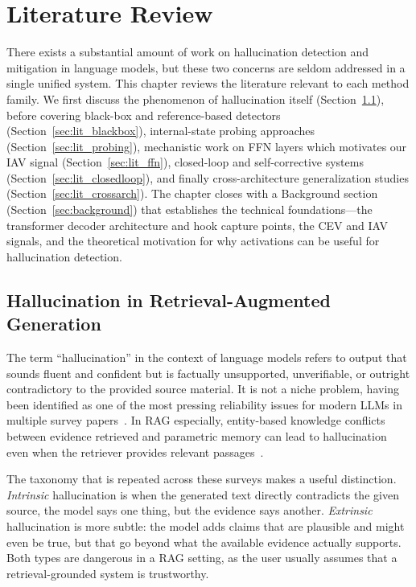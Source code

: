 \chapter{Literature Review}
\label{ch:literature_review}

There exists a substantial amount of work on hallucination detection and mitigation in language models, but these two concerns are seldom addressed in a single unified system. This chapter reviews the literature relevant to each method family. We first discuss the phenomenon of hallucination itself (Section~\ref{sec:lit_hallucination}), before covering black-box and reference-based detectors (Section~\ref{sec:lit_blackbox}), internal-state probing approaches (Section~\ref{sec:lit_probing}), mechanistic work on FFN layers which motivates our IAV signal (Section~\ref{sec:lit_ffn}), closed-loop and self-corrective systems (Section~\ref{sec:lit_closedloop}), and finally cross-architecture generalization studies (Section~\ref{sec:lit_crossarch}). The chapter closes with a Background section (Section~\ref{sec:background}) that establishes the technical foundations—the transformer decoder architecture and hook capture points, the CEV and IAV signals, and the theoretical motivation for why activations can be useful for hallucination detection.

\section{Hallucination in Retrieval-Augmented Generation}
\label{sec:lit_hallucination}

The term ``hallucination'' in the context of language models refers to output that sounds fluent and confident but is factually unsupported, unverifiable, or outright contradictory to the provided source material. It is not a niche problem, having been identified as one of the most pressing reliability issues for modern LLMs in multiple survey papers~\cite{ji2023hallucination,huang2023survey,rawte2023survey}. In RAG especially, entity-based knowledge conflicts between evidence retrieved and parametric memory can lead to hallucination even when the retriever provides relevant passages~\cite{longpre2021entity}.

The taxonomy that is repeated across these surveys makes a useful distinction. \emph{Intrinsic} hallucination is when the generated text directly contradicts the given source, the model says one thing, but the evidence says another. \emph{Extrinsic} hallucination is more subtle: the model adds claims that are plausible and might even be true, but that go beyond what the available evidence actually supports. Both types are dangerous in a RAG setting, as the user usually assumes that a retrieval-grounded system is trustworthy.

